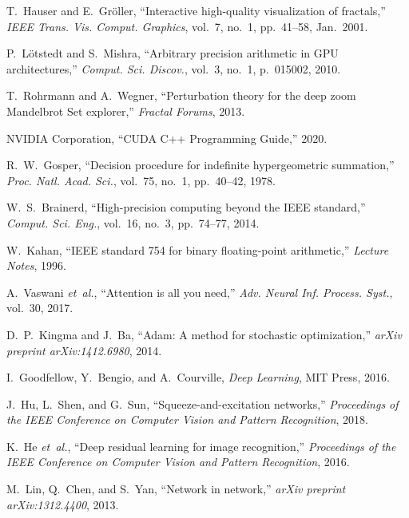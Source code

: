 \documentclass[journal]{IEEEaccess}
\begin{document}
\begin{thebibliography}{13}
T.~Hauser and E.~Gr{\"o}ller, ``Interactive high-quality visualization of fractals,'' \emph{IEEE Trans. Vis. Comput. Graphics}, vol.~7, no.~1, pp.~41--58, Jan.~2001.

P.~L{\"o}tstedt and S.~Mishra, ``Arbitrary precision arithmetic in GPU architectures,'' \emph{Comput. Sci. Discov.}, vol.~3, no.~1, p.~015002, 2010.

T.~Rohrmann and A.~Wegner, ``Perturbation theory for the deep zoom Mandelbrot Set explorer,'' \emph{Fractal Forums}, 2013.

NVIDIA Corporation, ``CUDA C++ Programming Guide,'' 2020.

R.~W.~Gosper, ``Decision procedure for indefinite hypergeometric summation,'' \emph{Proc. Natl. Acad. Sci.}, vol.~75, no.~1, pp.~40--42, 1978.

W.~S.~Brainerd, ``High-precision computing beyond the IEEE standard,'' \emph{Comput. Sci. Eng.}, vol.~16, no.~3, pp.~74--77, 2014.

W.~Kahan, ``IEEE standard 754 for binary floating-point arithmetic,'' \emph{Lecture Notes}, 1996.

A.~Vaswani \emph{et~al.}, ``Attention is all you need,'' \emph{Adv. Neural Inf. Process. Syst.}, vol.~30, 2017.

D.~P.~Kingma and J.~Ba, ``Adam: A method for stochastic optimization,'' \emph{arXiv preprint arXiv:1412.6980}, 2014.

I.~Goodfellow, Y.~Bengio, and A.~Courville, \emph{Deep Learning}, MIT Press, 2016.

J.~Hu, L.~Shen, and G.~Sun, ``Squeeze-and-excitation networks,'' \emph{Proceedings of the IEEE Conference on Computer Vision and Pattern Recognition}, 2018.

K.~He \emph{et~al.}, ``Deep residual learning for image recognition,'' \emph{Proceedings of the IEEE Conference on Computer Vision and Pattern Recognition}, 2016.

M.~Lin, Q.~Chen, and S.~Yan, ``Network in network,'' \emph{arXiv preprint arXiv:1312.4400}, 2013.
\end{thebibliography}
\end{document}
